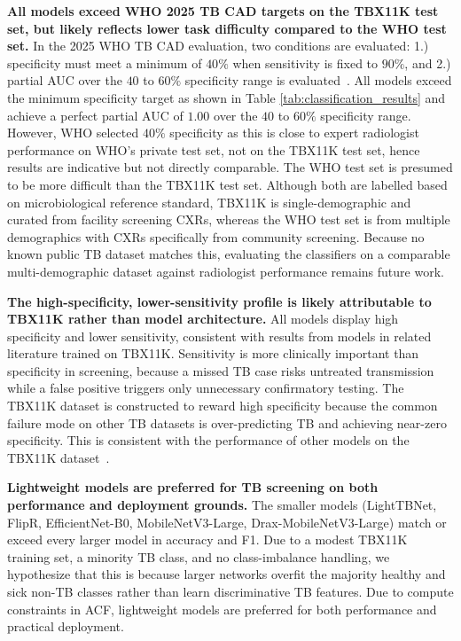 \documentclass[conference, letterpaper]{IEEEtran}
\begin{document}
\textbf{All models exceed WHO 2025 TB CAD targets on the TBX11K test set, but likely reflects lower task difficulty compared to the WHO test set.}
In the 2025 WHO TB CAD evaluation, two conditions are evaluated: 1.) specificity must meet a minimum of $40\%$ when sensitivity is fixed to $90\%$, and 2.) partial AUC over the $40$ to $60\%$ specificity range is evaluated~\cite{who_cad_approval_2025}. All models exceed the minimum specificity target as shown in Table \ref{tab:classification_results} and achieve a perfect partial AUC of $1.00$ over the $40$ to $60\%$ specificity range. However, WHO selected $40\%$ specificity as this is close to expert radiologist performance on WHO's private test set, not on the TBX11K test set, hence results are indicative but not directly comparable. The WHO test set is presumed to be more difficult than the TBX11K test set. Although both are labelled based on microbiological reference standard, TBX11K is single-demographic and curated from facility screening CXRs, whereas the WHO test set is from multiple demographics with CXRs specifically from community screening. Because no known public TB dataset matches this, evaluating the classifiers on a comparable multi-demographic dataset against radiologist performance remains future work.

\textbf{The high-specificity, lower-sensitivity profile is likely attributable to TBX11K rather than model architecture.}
All models display high specificity and lower sensitivity, consistent with results from models in related literature trained on TBX11K. Sensitivity is more clinically important than specificity in screening, because a missed TB case risks untreated transmission while a false positive triggers only unnecessary confirmatory testing. The TBX11K dataset is constructed to reward high specificity because the common failure mode on other TB datasets is over-predicting TB and achieving near-zero specificity. This is consistent with the performance of other models on the TBX11K dataset~\cite{liu2023tbx11k_pami}.

\textbf{Lightweight models are preferred for TB screening on both performance and deployment grounds.}
The smaller models (LightTBNet, FlipR, EfficientNet-B0, MobileNetV3-Large, Drax-MobileNetV3-Large) match or exceed every larger model in accuracy and F1. Due to a modest TBX11K training set, a minority TB class, and no class-imbalance handling, we hypothesize that this is because larger networks overfit the majority healthy and sick non-TB classes rather than learn discriminative TB features. Due to compute constraints in ACF, lightweight models are preferred for both performance and practical deployment.
\end{document}
